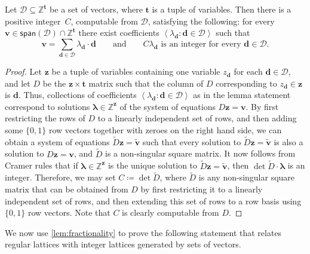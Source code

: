 \documentclass{article}
\newcommand{\Dd}{\mathcal{D}}
\newcommand{\Z}{\mathbb{Z}}
\newcommand{\tup}[1]{{\mathbf{#1}}}
\newcommand{\zz}{\tup z}
\newcommand{\tv}{\tup t}
\newcommand{\dd}{\tup d}
\newcommand{\myvv}{\tup v} %
\newcommand{\mset}[1]{\left\langle #1\right\rangle}
\newcommand{\spn}{\mathsf{span}}
\begin{document}
\begin{lemma}\label{lem:fractionality}
 Let $\Dd\subseteq \Z^\tv$ be a set of vectors, where $\tv$ is a tuple of variables. Then there is a positive integer~$C$, computable from $\Dd$, satisfying the following: for every $\myvv\in \spn(\Dd)\cap \Z^\tv$ there exist coefficients $\mset{\lambda_\dd\colon \dd\in \Dd}$ such that
 $$\myvv=\sum_{\dd\in \Dd} \lambda_\dd\cdot \dd\qquad \textrm{and}\qquad C\lambda_\dd\textrm{ is an integer for every }\dd\in \Dd.$$
\end{lemma}
\begin{proof}
 Let $\zz$ be a tuple of variables containing one variable $z_\dd$ for each $\dd\in \Dd$, and let $D$ be the $\zz\times \tv$ matrix such that the column of $D$ corresponding to $z_\dd\in \zz$ is $\dd$. Thus, collections of coefficients $\mset{\lambda_\dd\colon \dd\in \Dd}$ as in the lemma statement correspond to solutions $\boldsymbol{\lambda}\in \Z^\zz$ of the system of equations $D\zz=\myvv$. By first restricting the rows of $D$ to a linearly independent set of rows, and then adding some $\{0,1\}$ row vectors together with zeroes on the right hand side, we can obtain a system of equations $\widetilde{D}\zz=\widetilde{\myvv}$ such that every solution to $\widetilde{D}\zz=\widetilde{\myvv}$ is also a solution to $D\zz=\myvv$, and $\widetilde{D}$ is a non-singular square matrix. It now follows from Cramer rules that if $\boldsymbol{\lambda}\in \Z^\zz$ is the unique solution to $\widetilde{D}\zz=\widetilde{\myvv}$, then $\det \widetilde{D}\cdot {\boldsymbol{\lambda}}$ is an integer. Therefore, we may set $C\coloneqq \det \widetilde{D}$, where $\widetilde{D}$ is any non-singular square matrix that can be obtained from $D$ by first restricting it to a linearly independent set of rows, and then extending this set of rows to a row basis using $\{0,1\}$ row vectors. Note that $C$ is clearly computable from $D$.
\end{proof}

We now use \cref{lem:fractionality} to prove the following statement that relates regular lattices with integer lattices generated by sets of vectors.
\end{document}
